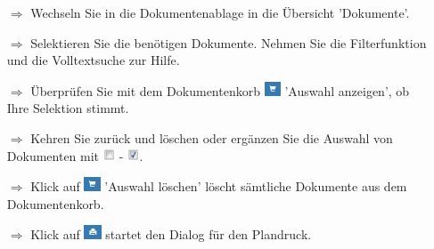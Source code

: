 \documentclass{article}
\begin{document}

\pagebreak
{}

\vspace{\baselineskip}


\begin{multicols}{2}

\begin{tcolorbox}[colback=blue!5,colframe=blue!40!black,title=Dokumente für den Plandruck selektieren]
\begin{itemize}
  \item[$\Longrightarrow$] Wechseln Sie in die Dokumentenablage in die Übersicht 'Dokumente'. 
  \item[$\Longrightarrow$] Selektieren Sie die benötigen Dokumente. Nehmen Sie die Filterfunktion und die Volltextsuche zur Hilfe.
  \item[$\Longrightarrow$] Überprüfen Sie mit dem Dokumentenkorb \includegraphics[height=12pt]{Icons/dk_korb_b.jpg} 'Auswahl anzeigen', ob Ihre Selektion stimmt.
  \item[$\Longrightarrow$] Kehren Sie zurück und löschen oder ergänzen Sie die Auswahl von Dokumenten mit \includegraphics[height=10pt]{Icons/checkbox_leer.jpg} - \includegraphics[height=10pt]{Icons/checkbox_markiert.jpg}.
	\item[$\Longrightarrow$] Klick auf \includegraphics[height=12pt]{Icons/dk_korb_b.jpg} 'Auswahl löschen' löscht sämtliche Dokumente aus dem Dokumentenkorb.
	\item[$\Longrightarrow$] Klick auf \includegraphics[height=12pt]{Icons/dk_drucken.jpg} startet den Dialog für den Plandruck.
\end{itemize}
\end{tcolorbox}



\end{multicols}
\end{document}
